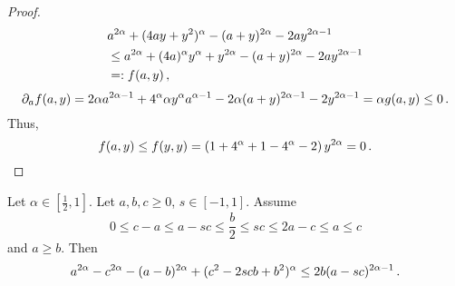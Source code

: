 \begin{proof}
	\begin{align*}
		&a^{2\alpha} + (4 a y + y^2)^\alpha - (a+y)^{2\alpha} - 2 a y^{2\alpha-1}
		\\&\leq 
		a^{2\alpha} + (4 a)^\alpha y^\alpha +y^{2\alpha} - (a+y)^{2\alpha} - 2 a y^{2\alpha-1}
		\\&=:f(a,y)
		\, ,
	\end{align*}
	\begin{equation*}
		\partial_a f(a,y) = 2\alpha a^{2\alpha-1} + 4^\alpha \alpha y^\alpha a^{\alpha-1} - 2\alpha(a+y)^{2\alpha-1} - 2y^{2\alpha-1}
		= \alpha g(a,y) \leq 0
		\, .
	\end{equation*}
	Thus,
	\begin{equation*}
		f(a,y) \leq f(y,y) = \left( 1+4^\alpha+1-4^\alpha-2 \right) y^{2\alpha} = 0
		\, .
	\end{equation*}
\end{proof}
%
\begin{lemma}\label{lmm:bgeqascandageqb}
	Let $\alpha\in[\frac12,1]$.
	Let $a,b,c\geq0$, $s\in[-1,1]$.
	Assume 
	\begin{equation*}
		0 \leq c - a \leq a -sc \leq \frac b2 \leq sc \leq 2a-c \leq a \leq c
	\end{equation*}
	and
	$a \geq b$.
	Then
	\begin{equation*}
		a^{2\alpha}-c^{2\alpha}-(a-b)^{2\alpha}+(c^2 - 2 s c b + b^2)^\alpha 
		\leq 
		2 b (a-sc)^{2\alpha-1}
		\, .
	\end{equation*}
\end{lemma}
%
